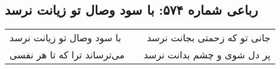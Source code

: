\begin{center}
\section*{رباعی شماره ۵۷۴: با سود وصال تو زیانت نرسد}
\label{sec:0574}
\begin{longtable}{l p{0.5cm} r}
با سود وصال تو زیانت نرسد
&&
جانی تو که زحمتی بجانت نرسد
\\
می‌ترساند ترا که تا هر نفسی
&&
پر دل شوی و چشم بدانت نرسد
\\
\end{longtable}
\end{center}
